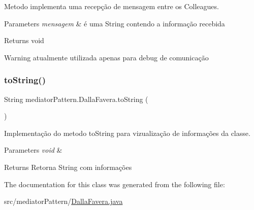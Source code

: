 Metodo implementa uma recepção de mensagem entre os Colleagues. 


\begin{DoxyParams}{Parameters}
{\em mensagem} & é uma String contendo a informação recebida \\
\hline
\end{DoxyParams}
\begin{DoxyReturn}{Returns}
void 
\end{DoxyReturn}
\begin{DoxyWarning}{Warning}
atualmente utilizada apenas para debug de comunicação 
\end{DoxyWarning}
\mbox{\label{classmediator_pattern_1_1_dalla_favera_a7b255e14ecacd6f0bb0e5658ad26437d}} 
\subsubsection{\texorpdfstring{toString()}{toString()}}
{\footnotesize\ttfamily String mediator\+Pattern.\+Dalla\+Favera.\+to\+String (\begin{DoxyParamCaption}{ }\end{DoxyParamCaption})}



Implementação do metodo to\+String para vizualização de informações da classe. 


\begin{DoxyParams}{Parameters}
{\em void} & \\
\hline
\end{DoxyParams}
\begin{DoxyReturn}{Returns}
Retorna String com informações 
\end{DoxyReturn}


The documentation for this class was generated from the following file\+:\begin{DoxyCompactItemize}
\item 
src/mediator\+Pattern/\mbox{\hyperlink{_dalla_favera_8java}{Dalla\+Favera.\+java}}\end{DoxyCompactItemize}
